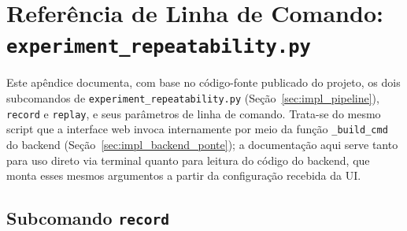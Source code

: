 \chapter{Referência de Linha de Comando: \texttt{experiment\_\allowbreak repeatability.py}}
\label{ap:cli_reference}

Este apêndice documenta, com base no código-fonte publicado do projeto, os dois
subcomandos de \texttt{experiment\_\allowbreak repeatability.py} (Seção~\ref{sec:impl_pipeline}),
\texttt{record} e \texttt{replay}, e seus parâmetros de linha de comando.
Trata-se do mesmo script que a interface web invoca internamente por meio da
função \texttt{\_\allowbreak build\_\allowbreak cmd} do backend (Seção~\ref{sec:impl_backend_ponte}); a
documentação aqui serve tanto para uso direto via terminal quanto para leitura
do código do backend, que monta esses mesmos argumentos a partir da configuração
recebida da UI.

\section{Subcomando \texttt{record}}


